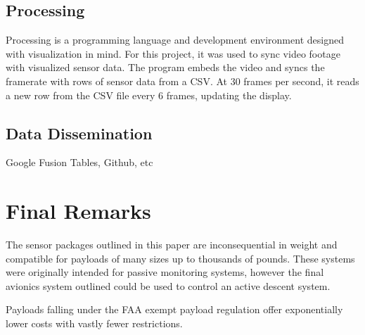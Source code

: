 \documentclass[heading.tex]{subfiles}
\begin{document}
\subsection{Processing}

Processing is a programming language and development environment designed
with visualization in mind. For this project, it was used to sync video
footage with visualized sensor data. The program embeds the video and syncs
the framerate with rows of sensor data from a CSV. At 30 frames per second,
it reads a new row from the CSV file every 6 frames, updating the display.

\subsection{Data Dissemination}

Google Fusion Tables, Github, etc

\section{Final Remarks}
The sensor packages outlined in this paper are inconsequential in weight and
compatible for payloads of many sizes up to thousands of pounds.
These systems were originally intended for passive monitoring systems, however the final avionics system outlined could be used to control an active descent system.

Payloads falling under the FAA exempt payload regulation offer exponentially
lower costs with vastly fewer restrictions. 
\end{document}
